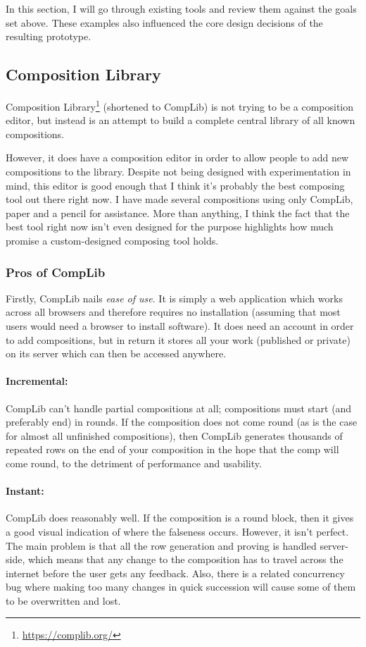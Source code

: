 \documentclass[12pt]{article}
\newcommand{\footurl}[1]{\footnote{\url{#1}}}
\begin{document}
In this section, I will go through existing tools and review them against the goals set above.
These examples also influenced the core design decisions of the resulting prototype.

\subsection{Composition Library}

Composition Library\footurl{https://complib.org/} (shortened to CompLib) is not
trying to be a composition editor, but instead is an attempt to build a complete central library of
all known compositions.

However, it does have a composition editor in order to allow people to add new compositions to the
library.  Despite not being designed with experimentation in mind, this editor is good enough that
I think it's probably the best composing tool out there right now.  I have made several
compositions using only CompLib, paper and a pencil for assistance.  More than anything, I think the
fact that the best tool right now isn't even designed for the purpose highlights how much promise a
custom-designed composing tool holds.

\subsubsection{Pros of CompLib}

Firstly, CompLib nails \emph{ease of use}.  It is simply a web application which works across all
browsers and therefore requires no installation (assuming that most users would need a browser to
install software).  It does need an account in order to add compositions, but in return it stores
all your work (published or private) on its server which can then be accessed anywhere.

\paragraph{Incremental:}  CompLib can't handle partial compositions at all; compositions must start
(and preferably end) in rounds.  If the composition does not come round (as is the case for almost
all unfinished compositions), then CompLib generates thousands of repeated rows on the end of your
composition in the hope that the comp will come round, to the detriment of performance and
usability.

\paragraph{Instant:}  CompLib does reasonably well.  If the composition is a round block, then it
gives a good visual indication of where the falseness occurs.  However, it isn't perfect.  The main
problem is that all the row generation and proving is handled server-side, which means that any
change to the composition has to travel across the internet before the user gets any feedback.
Also, there is a related concurrency bug where making too many changes in quick succession will
cause some of them to be overwritten and lost.
\end{document}
